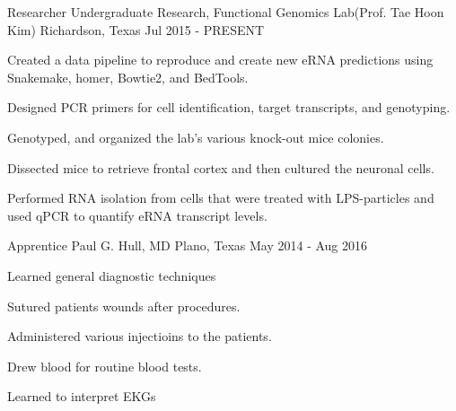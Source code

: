 \begin{cventries}
  \cventry
    {Researcher} %
    {Undergraduate Research, Functional Genomics Lab(Prof. Tae Hoon Kim)} %
    {Richardson, Texas} %
    {Jul 2015 - PRESENT} %
    {
      \begin{cvitems} %
        \item {Created a data pipeline to reproduce and create new eRNA predictions using Snakemake, homer, Bowtie2, and BedTools.}
        \item {Designed PCR primers for cell identification, target transcripts, and genotyping.}
        \item {Genotyped, and organized the lab's various knock-out mice colonies.}
        \item {Dissected mice to retrieve frontal cortex and then cultured the neuronal cells.}
        \item {Performed RNA isolation from cells that were treated with LPS-particles and used qPCR to quantify eRNA transcript levels.}
      \end{cvitems}
    }

  \cventry
    {Apprentice} %
    {Paul G. Hull, MD} %
    {Plano, Texas} %
    {May 2014 - Aug 2016} %
    {
      \begin{cvitems} %
        \item {Learned general diagnostic techniques}
        \item {Sutured patients wounds after procedures.}
        \item {Administered various injectioins to the patients.}
        \item {Drew blood for routine blood tests.}
        \item {Learned to interpret EKGs}
      \end{cvitems}
    }

\end{cventries}
